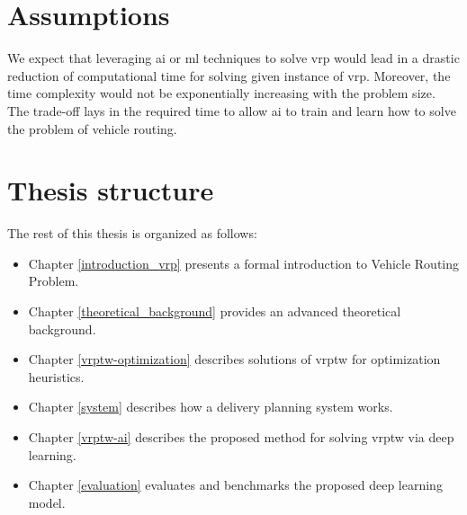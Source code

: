 \begin{introduction}
    \section{Assumptions} 
    We expect that leveraging \gls{ai} or \gls{ml} techniques to solve \gls{vrp} would lead in a drastic reduction of computational time for solving given instance of \gls{vrp}. Moreover, the time complexity would not be exponentially increasing with the problem size. The trade-off lays in the required time to allow \gls{ai} to train and learn how to solve the problem of vehicle routing.
    
    \section{Thesis structure}
    The rest of this thesis is organized as follows:
    \begin{itemize}
        \item Chapter \ref{introduction_vrp} presents a formal introduction to Vehicle Routing Problem.
        \item Chapter \ref{theoretical_background} provides an advanced theoretical background.
        \item Chapter \ref{vrptw-optimization} describes solutions of \gls{vrptw} for optimization heuristics.
        \item Chapter \ref{system} describes how a delivery planning system works.
        \item Chapter \ref{vrptw-ai} describes the proposed method for solving \gls{vrptw} via deep learning.
        \item Chapter \ref{evaluation} evaluates and benchmarks the proposed deep learning model.
    \end{itemize}
\end{introduction}
